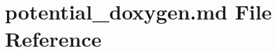 \hypertarget{potential__doxygen_8md}{\section{potential\-\_\-doxygen.\-md File Reference}
\label{potential__doxygen_8md}
}
